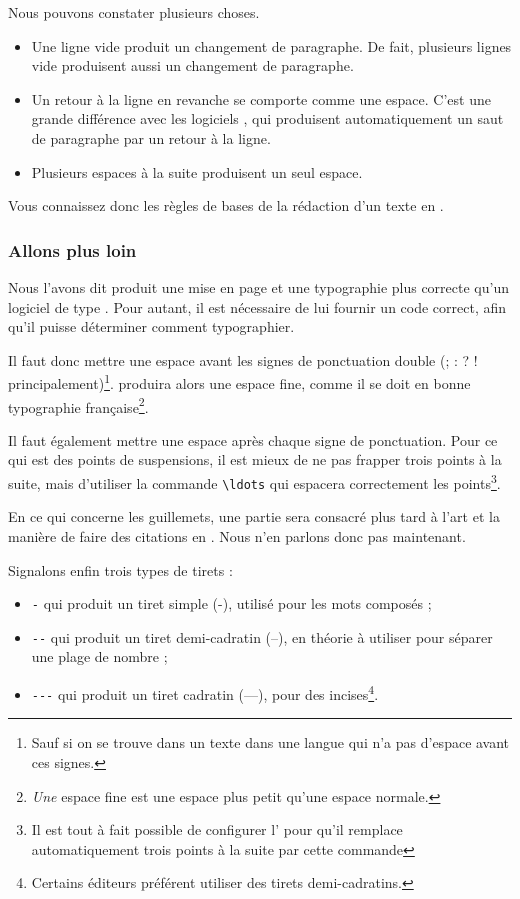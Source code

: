 Nous pouvons constater plusieurs choses.
\begin{itemize}
\item Une ligne vide produit un changement de paragraphe. De fait, plusieurs lignes vide produisent aussi un changement de paragraphe.
\item Un retour à la ligne en revanche se comporte comme une espace. C'est une grande différence avec les logiciels , qui produisent automatiquement un saut de paragraphe par un retour à la ligne.
\item Plusieurs espaces à la suite produisent un seul espace. 
\end{itemize}

Vous connaissez donc les règles de bases de la rédaction d'un texte en \logiciel{\LaTeX}.

\subsubsection{Allons plus loin}


Nous l'avons dit \logiciel{\LaTeX} produit une mise en page et une typographie plus correcte qu'un logiciel de type . Pour autant, il est nécessaire de lui fournir un code correct, afin qu'il puisse déterminer comment typographier.

Il faut donc mettre une espace avant les signes de ponctuation double (; : ? ! principalement)\footnote{Sauf si on se trouve dans un texte dans une langue qui n'a pas d'espace avant ces signes.}. \logiciel{\LaTeX} produira alors une espace fine, comme il se doit en bonne typographie fran\c caise\footnote{\emph{Une} espace fine est une espace plus petit qu'une espace normale.}.

Il faut également mettre une espace après chaque signe de ponctuation. Pour ce qui est des points de suspensions, il est mieux de ne pas frapper trois points à la suite, mais d'utiliser la commande \verb|\ldots| qui espacera correctement les points\footnote{Il est tout à fait possible de configurer l' pour qu'il remplace automatiquement trois points à la suite par cette commande}.

En ce qui concerne les guillemets, une partie sera consacré plus tard à l'art et la manière de faire des citations en \logiciel{\LaTeX}. Nous n'en parlons donc pas maintenant.

Signalons enfin trois types de tirets :
\begin{itemize}
\item \verb|-| qui produit un tiret simple (-), utilisé pour les mots composés ;
\item \verb|--| qui produit un tiret demi-cadratin (--), en théorie à utiliser pour séparer une plage de nombre ;
\item \verb|---| qui produit un tiret cadratin (---), pour des incises\footnote{Certains éditeurs préférent utiliser des tirets demi-cadratins.}.
\end{itemize}
 
